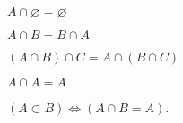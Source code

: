 \begin{proposition}
$A \cap  \varnothing = \varnothing$\end{proposition}
\begin{proposition}[Commutativity]
$A \cap B = B \cap A$\end{proposition}
\begin{proposition}[Associativity]
$(A \cap  B) \cap  C = A \cap  (B \cap  C)$\end{proposition}
\begin{proposition}
$A \cap  A = A$\end{proposition}
\begin{proposition}
$(A \subset B) \iff (A \cap B = A)$.\end{proposition}